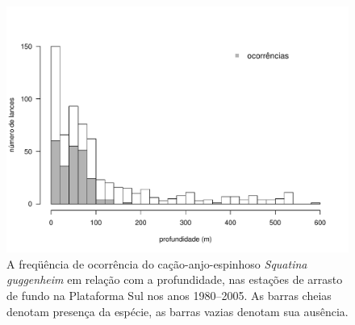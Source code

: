 \documentclass[a4paper,11pt,twoside,showtrims,onecolumn,openright,final]{memoir}
\begin{document}
\begin{figure}
\begin{center}
\includegraphics[width=\textwidth]{Guggenheim_DistribProf}
\end{center}
\caption[A freqüência de ocorrência do cação-anjo-espinhoso \emph{Squatina guggenheim} 
	em relação com a profundidade, nas estações de arrasto de 
	fundo na Plataforma Sul nos anos 1980--2005]
	{A freqüência de ocorrência do cação-anjo-espinhoso \emph{Squatina guggenheim} 
	em relação com a profundidade, nas estações de arrasto de 
	fundo na Plataforma Sul nos anos 1980--2005. 
	As barras cheias denotam presença da espécie, 
	as barras vazias denotam sua ausência.}
\label{fig:fo-guggenheim-profundidade}
\end{figure}


%
%
\end{document}
